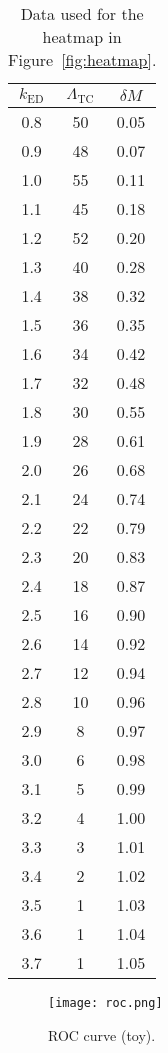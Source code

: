 \documentclass[11pt]{article}
\begin{document}
\begin{table}[ht]
  \centering
  \small
  \begin{tabular}{ccc}
    \toprule
    $k_{\mathrm{ED}}$ & $\Lambda_{\mathrm{TC}}$ & $\delta M$ \\
    \midrule
    0.8 & 50 & 0.05 \\
    0.9 & 48 & 0.07 \\
    1.0 & 55 & 0.11 \\
    1.1 & 45 & 0.18 \\
    1.2 & 52 & 0.20 \\
    1.3 & 40 & 0.28 \\
    1.4 & 38 & 0.32 \\
    1.5 & 36 & 0.35 \\
    1.6 & 34 & 0.42 \\
    1.7 & 32 & 0.48 \\
    1.8 & 30 & 0.55 \\
    1.9 & 28 & 0.61 \\
    2.0 & 26 & 0.68 \\
    2.1 & 24 & 0.74 \\
    2.2 & 22 & 0.79 \\
    2.3 & 20 & 0.83 \\
    2.4 & 18 & 0.87 \\
    2.5 & 16 & 0.90 \\
    2.6 & 14 & 0.92 \\
    2.7 & 12 & 0.94 \\
    2.8 & 10 & 0.96 \\
    2.9 &  8 & 0.97 \\
    3.0 &  6 & 0.98 \\
    3.1 &  5 & 0.99 \\
    3.2 &  4 & 1.00 \\
    3.3 &  3 & 1.01 \\
    3.4 &  2 & 1.02 \\
    3.5 &  1 & 1.03 \\
    3.6 &  1 & 1.04 \\
    3.7 &  1 & 1.05 \\
    \bottomrule
  \end{tabular}
  \caption{Data used for the heatmap in Figure~\ref{fig:heatmap}.}
  \label{tab:heatdata}
\end{table}

\begin{figure}[ht]
  \centering
  \texttt{[image: roc.png]}
  \caption{ROC curve (toy).}
  \label{fig:roc}
\end{figure}
\end{document}
